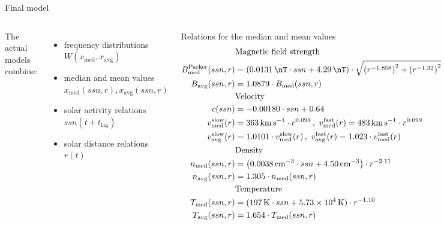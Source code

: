 \begin{frame}[plain,c]{Final model}{}
	\begin{columns}[c]
	
		
		The actual models combine:
		\begin{itemize}
			\item frequency distributions\\
				$W(x_\text{med},x_\text{avg})$
			\item median and mean values\\
				$x_\text{med}(ssn,r),x_\text{avg}(ssn,r)$
			\item solar activity relations\\
				$ssn(t+t_\text{lag})$
			\item solar distance relations\\
				$r(t)$
		\end{itemize}

	
		\begin{block}{Relations for the median and mean values}
			\scriptsize
			\begin{align*}
			&\text{Magnetic field strength}\\
				B^\text{Parker}_\text{med}(ssn,r) &= \left(\SI{0.0131}{\nT} \cdot ssn + \SI{4.29}{\nT}\right) \cdot \sqrt{\left(r^{-1.858}\right)^2 + \left(r^{-1.32}\right)^2}\\
				B_\text{avg}(ssn,r) &= 1.0879 \cdot B_\text{med}(ssn,r)\\
			&\text{Velocity}\\
				c(ssn) &= -0.00180 \cdot ssn + 0.64\\
				v_\text{med}^\text{slow}(r) &= \SI{363}{\km\per\s} \cdot r^{0.099}	\,,~   v_\text{med}^\text{fast}(r) = \SI{483}{\km\per\s} \cdot r^{0.099}\\
				v_\text{avg}^\text{slow}(r) &= 1.0101 \cdot v_\text{med}^\text{slow}(r)	\,,~   v_\text{avg}^\text{fast}(r) = 1.023 \cdot v_\text{med}^\text{fast}(r)\\
			&\text{Density}\\
				n_\text{med}(ssn,r) &= \left(\SI{0.0038}{\per\cm\cubed} \cdot ssn + \SI{4.50}{\per\cm\cubed}\right) \cdot r^{-2.11}\\
				n_\text{avg}(ssn,r) &= 1.305 \cdot n_\text{med}(ssn,r)\\
			&\text{Temperature}\\
				T_\text{med}(ssn,r) &= (\SI{197}{\K} \cdot ssn + \SI{5.73e4}{\K}) \cdot r^{-1.10}\\
				T_\text{avg}(ssn,r) &= 1.654 \cdot T_\text{med}(ssn,r)
			\end{align*}
		\end{block}
	\end{columns}
\end{frame}

